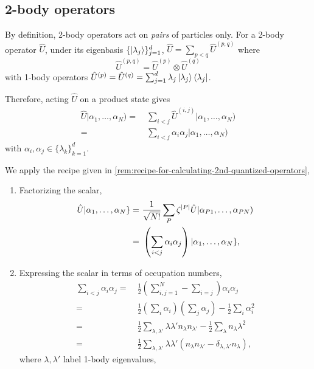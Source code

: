 \documentclass{article}
\theoremstyle{definition}
\theoremstyle{plain}
\numberwithin{equation}{section}
\begin{document}
\subsection{2-body operators}

By definition, 2-body operators act on 
\emph{pairs} of particles only. 
For a 2-body operator $\hat{U}$, under its 
eigenbasis 
$\{\ket{\lambda_{j}}\}_{j=1}^{d}$, 
$\hat{U}=\sum_{p < q}\hat{U}^{(p,q)}$ where  
\[
    \hat{U}^{(p,q)}=\hat{U}^{(p)}\otimes \hat{U}^{(q)}
\]
with 1-body operators 
$\hat{U}^{(p)}=\hat{U}^{(q)}=
\sum_{j=1}^{d}\lambda_{j} \ket{\lambda_{j}}
\bra{\lambda_{j}}$. 

Therefore, acting $\hat{U}$ on a product state gives 
\begin{align*}
    \hat{U}
    |\alpha_1, \ldots ,\alpha_{N})
    =&\ 
    \sum_{i<j}
    \hat{U}^{(i,j)}
    |\alpha_1, \ldots ,\alpha_{N}) \\
    =&\ 
    \sum_{i<j}
    \alpha_{i}\alpha_{j}
    |\alpha_1, \ldots ,\alpha_{N})
\end{align*}
with 
$\alpha_{i},\alpha_{j} 
\in 
\{\lambda_{k}\}_{k=1}^{d}$.

We apply the recipe given in 
\cref{rem:recipe-for-calculating-2nd-quantized-operators},

\begin{enumerate}
    \item Factorizing the scalar,
    \begin{align*}
        \hat{U} 
        |\alpha_1, \ldots ,\alpha_{N}\}
        =&\ 
        \frac{1}{\sqrt{N!}}
        \sum_{P}\zeta^{\abs{P}}
        \hat{U}
        |\alpha_{P1}, \ldots ,\alpha_{PN}) \\
        =&\ 
        \left( 
            \sum_{i<j}
            \alpha_{i}\alpha_{j}
         \right) 
        |\alpha_{1}, \ldots ,\alpha_{N}\},
    \end{align*}
    \item Expressing the scalar 
    in terms of occupation numbers,
    \begin{align*}
        \sum_{i<j}
        \alpha_{i}\alpha_{j}
        =&\ 
        \frac{1}{2}
        \left( 
            \sum_{i,j=1}^{N}
            -
            \sum_{i=j}
         \right) 
        \alpha_{i}\alpha_{j} \\
        =&\ 
        \frac{1}{2}
        (\sum_{i}\alpha_{i})
        (\sum_{j}\alpha_{j})
        -
        \frac{1}{2}\sum_{i}\alpha_{i}^{2} \\
        =&\ 
        \frac{1}{2}\sum_{\lambda,\lambda'}
        \lambda \lambda' 
        n_{\lambda} n_{\lambda '}
        -
        \frac{1}{2}
        \sum_{\lambda} n_{\lambda} \lambda^{2} \\
        =&\ 
        \frac{1}{2}\sum_{\lambda,\lambda'}
        \lambda \lambda '
        (
            n_{\lambda} n_{\lambda '}
            -
            \delta_{\lambda,\lambda '}
            n_{\lambda}
        ),
    \end{align*}
    where $\lambda, \lambda'$ label 
    1-body eigenvalues,
\end{enumerate}
\end{document}
